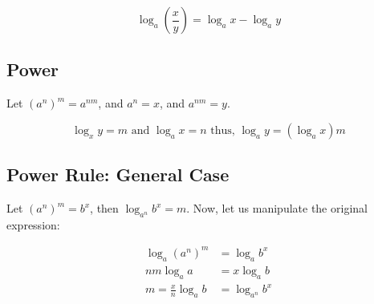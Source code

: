 \[
    \log_a \left(\frac{x}{y}\right) = \log_a x - \log_a y
\]

\QED 

\subsection{Power}

Let \((a^n)^m = a^{nm}\), and \(a^n = x\), and \(a^{nm} = y\).

\[
    \log_x y = m \text{ and } \log_a x = n \text{ thus, } \log_a y = (\log_a x )m
\]

\QED

\subsection{Power Rule: General Case}

Let \((a^n)^m = b^x\), then \(\log_{a^n} b^x = m\). Now, let us manipulate the original expression:

\begin{align*}
    \log_a {(a^n)}^m &= \log_a b^x\\
    nm \log_a a &= x \log_a b\\
    m = \frac{x}{n} \log_a b &=  \log_{a^n} b^x 
\end{align*}

\QED
